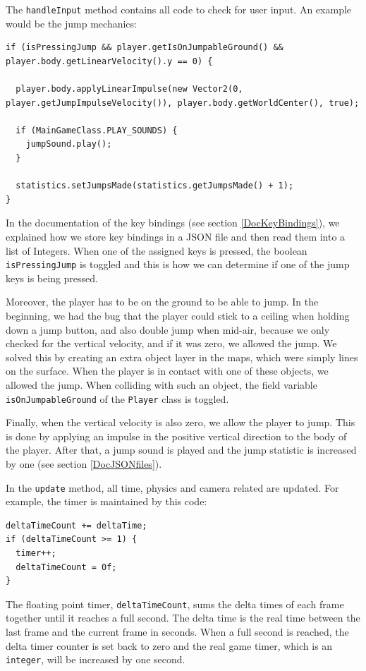 \documentclass[12p]{article}
\begin{document}
The \texttt{handleInput} method contains all code to check for user input. An example would be the jump mechanics:

\begin{verbatim}
if (isPressingJump && player.getIsOnJumpableGround() && player.body.getLinearVelocity().y == 0) {

  player.body.applyLinearImpulse(new Vector2(0, player.getJumpImpulseVelocity()), player.body.getWorldCenter(), true);

  if (MainGameClass.PLAY_SOUNDS) {
    jumpSound.play();
  }

  statistics.setJumpsMade(statistics.getJumpsMade() + 1);
}
\end{verbatim}

In the documentation of the key bindings (see section \ref{DocKeyBindings}), we explained how we store key bindings in a JSON file and then read them into a list of Integers. When one of the assigned keys is pressed, the boolean \texttt{isPressingJump} is toggled and this is how we can determine if one of the jump keys is being pressed.

Moreover, the player has to be on the ground to be able to jump. In the beginning, we had the bug that the player could stick to a ceiling when holding down a jump button, and also double jump when mid-air, because we only checked for the vertical velocity, and if it was zero, we allowed the jump. We solved this by creating an extra object layer in the maps, which were simply lines on the surface. When the player is in contact with one of these objects, we allowed the jump. When colliding with such an object, the field variable \texttt{isOnJumpableGround} of the \texttt{Player} class is toggled.

Finally, when the vertical velocity is also zero, we allow the player to jump. This is done by applying an impulse in the positive vertical direction to the body of the player. After that, a jump sound is played and the jump statistic is increased by one (see section \ref{DocJSONfiles}).

In the \texttt{update} method, all time, physics and camera related are updated. For example, the timer is maintained by this code:

\begin{verbatim}
deltaTimeCount += deltaTime;
if (deltaTimeCount >= 1) {
  timer++;
  deltaTimeCount = 0f;
}
\end{verbatim}

The floating point timer, \texttt{deltaTimeCount}, sums the delta times of each frame together until it reaches a full second. The delta time is the real time between the last frame and the current frame in seconds. When a full second is reached, the delta timer counter is set back to zero and the real game timer, which is an \texttt{integer}, will be increased by one second.
\end{document}
